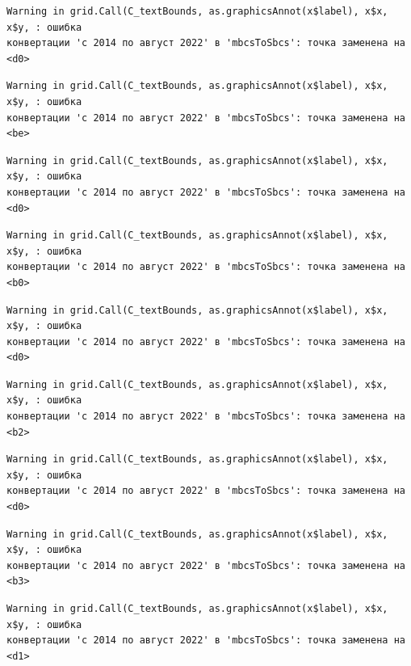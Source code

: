 \documentclass[
  letterpaper,
  DIV=11,
  numbers=noendperiod]{scrreprt}
\begin{document}
\begin{verbatim}
Warning in grid.Call(C_textBounds, as.graphicsAnnot(x$label), x$x, x$y, : ошибка
конвертации 'с 2014 по август 2022' в 'mbcsToSbcs': точка заменена на <d0>
\end{verbatim}

\begin{verbatim}
Warning in grid.Call(C_textBounds, as.graphicsAnnot(x$label), x$x, x$y, : ошибка
конвертации 'с 2014 по август 2022' в 'mbcsToSbcs': точка заменена на <be>
\end{verbatim}

\begin{verbatim}
Warning in grid.Call(C_textBounds, as.graphicsAnnot(x$label), x$x, x$y, : ошибка
конвертации 'с 2014 по август 2022' в 'mbcsToSbcs': точка заменена на <d0>
\end{verbatim}

\begin{verbatim}
Warning in grid.Call(C_textBounds, as.graphicsAnnot(x$label), x$x, x$y, : ошибка
конвертации 'с 2014 по август 2022' в 'mbcsToSbcs': точка заменена на <b0>
\end{verbatim}

\begin{verbatim}
Warning in grid.Call(C_textBounds, as.graphicsAnnot(x$label), x$x, x$y, : ошибка
конвертации 'с 2014 по август 2022' в 'mbcsToSbcs': точка заменена на <d0>
\end{verbatim}

\begin{verbatim}
Warning in grid.Call(C_textBounds, as.graphicsAnnot(x$label), x$x, x$y, : ошибка
конвертации 'с 2014 по август 2022' в 'mbcsToSbcs': точка заменена на <b2>
\end{verbatim}

\begin{verbatim}
Warning in grid.Call(C_textBounds, as.graphicsAnnot(x$label), x$x, x$y, : ошибка
конвертации 'с 2014 по август 2022' в 'mbcsToSbcs': точка заменена на <d0>
\end{verbatim}

\begin{verbatim}
Warning in grid.Call(C_textBounds, as.graphicsAnnot(x$label), x$x, x$y, : ошибка
конвертации 'с 2014 по август 2022' в 'mbcsToSbcs': точка заменена на <b3>
\end{verbatim}

\begin{verbatim}
Warning in grid.Call(C_textBounds, as.graphicsAnnot(x$label), x$x, x$y, : ошибка
конвертации 'с 2014 по август 2022' в 'mbcsToSbcs': точка заменена на <d1>
\end{verbatim}
\end{document}
